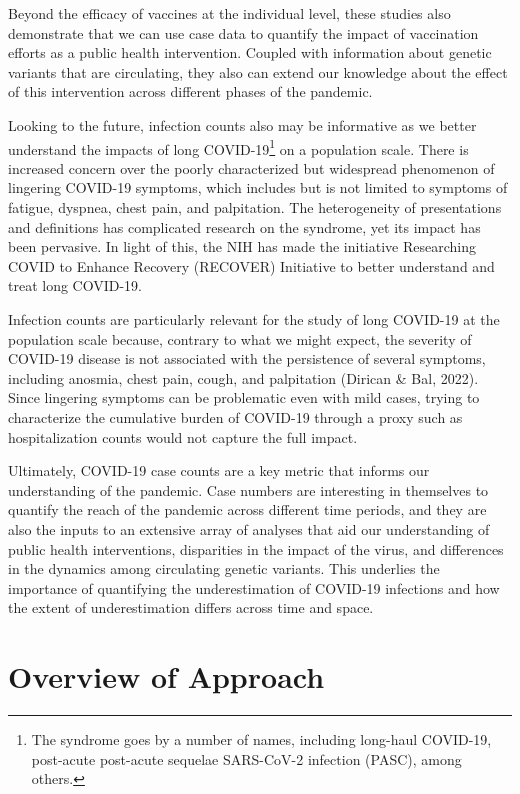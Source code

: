 \documentclass[12pt,twoside]{smiththesis}
\begin{document}
Beyond the efficacy of vaccines at the individual level, these studies also demonstrate that we can use case data to quantify the impact of vaccination efforts as a public health intervention. Coupled with information about genetic variants that are circulating, they also can extend our knowledge about the effect of this intervention across different phases of the pandemic.

Looking to the future, infection counts also may be informative as we better understand the impacts of long COVID-19\footnote{The syndrome goes by a number of names, including long-haul COVID-19, post-acute post-acute sequelae SARS-CoV-2 infection (PASC), among others.} on a population scale. There is increased concern over the poorly characterized but widespread phenomenon of lingering COVID-19 symptoms, which includes but is not limited to symptoms of fatigue, dyspnea, chest pain, and palpitation. The heterogeneity of presentations and definitions has complicated research on the syndrome, yet its impact has been pervasive. In light of this, the NIH has made the initiative Researching COVID to Enhance Recovery (RECOVER) Initiative to better understand and treat long COVID-19.

Infection counts are particularly relevant for the study of long COVID-19 at the population scale because, contrary to what we might expect, the severity of COVID-19 disease is not associated with the persistence of several symptoms, including anosmia, chest pain, cough, and palpitation (Dirican \& Bal, 2022). Since lingering symptoms can be problematic even with mild cases, trying to characterize the cumulative burden of COVID-19 through a proxy such as hospitalization counts would not capture the full impact.

Ultimately, COVID-19 case counts are a key metric that informs our understanding of the pandemic. Case numbers are interesting in themselves to quantify the reach of the pandemic across different time periods, and they are also the inputs to an extensive array of analyses that aid our understanding of public health interventions, disparities in the impact of the virus, and differences in the dynamics among circulating genetic variants. This underlies the importance of quantifying the underestimation of COVID-19 infections and how the extent of underestimation differs across time and space.

\hypertarget{overview-of-approach}{%
\chapter{Overview of Approach}\label{overview-of-approach}}
\end{document}
